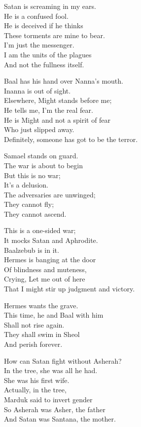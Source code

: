 \documentclass[
]{book}
\begin{document}
Satan is screaming in my ears.\\
He is a confused fool.\\
He is deceived if he thinks\\
These torments are mine to bear.\\
I'm just the messenger.\\
I am the units of the plagues\\
And not the fullness itself.

Baal has his hand over Nanna's mouth.\\
Inanna is out of sight.\\
Elsewhere, Might stands before me;\\
He tells me, I'm the real fear.\\
He is Might and not a spirit of fear\\
Who just slipped away.\\
Definitely, someone has got to be the terror.

Samael stands on guard.\\
The war is about to begin\\
But this is no war;\\
It's a delusion.\\
The adversaries are unwinged;\\
They cannot fly;\\
They cannot ascend.

This is a one-sided war;\\
It mocks Satan and Aphrodite.\\
Baalzebub is in it.\\
Hermes is banging at the door\\
Of blindness and muteness,\\
Crying, Let me out of here\\
That I might stir up judgment and victory.

Hermes wants the grave.\\
This time, he and Baal with him\\
Shall not rise again.\\
They shall swim in Sheol\\
And perish forever.

How can Satan fight without Asherah?\\
In the tree, she was all he had.\\
She was his first wife.\\
Actually, in the tree,\\
Marduk said to invert gender\\
So Asherah was Asher, the father\\
And Satan was Santana, the mother.
\end{document}

